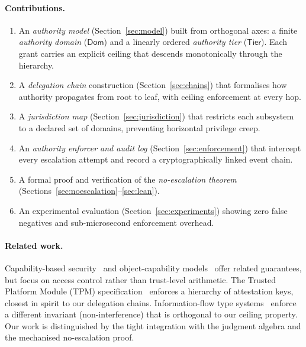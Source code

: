 \documentclass[11pt]{article}
\newcommand{\ADom}{\mathsf{Dom}}            %
\newcommand{\ATier}{\mathsf{Tier}}          %
\begin{document}
\paragraph{Contributions.}
\begin{enumerate}[leftmargin=1.5em,itemsep=2pt]
  \item An \emph{authority model} (Section~\ref{sec:model}) built from
        orthogonal axes: a finite \emph{authority domain}
        ($\ADom$) and a linearly ordered \emph{authority tier}
        ($\ATier$).  Each grant carries an explicit ceiling that
        descends monotonically through the hierarchy.
  \item A \emph{delegation chain} construction
        (Section~\ref{sec:chains}) that formalises how authority
        propagates from root to leaf, with ceiling enforcement at
        every hop.
  \item A \emph{jurisdiction map} (Section~\ref{sec:jurisdiction})
        that restricts each subsystem to a declared set of domains,
        preventing horizontal privilege creep.
  \item An \emph{authority enforcer and audit log}
        (Section~\ref{sec:enforcement}) that intercept every
        escalation attempt and record a cryptographically linked
        event chain.
  \item A formal proof and \LEAN{} verification of the
        \emph{no-escalation theorem}
        (Sections~\ref{sec:noescalation}--\ref{sec:lean}).
  \item An experimental evaluation (Section~\ref{sec:experiments})
        showing zero false negatives and sub-microsecond enforcement
        overhead.
\end{enumerate}

\paragraph{Related work.}
Capability-based security~\cite{dennis1966} and
object-capability models~\cite{miller2006} offer related guarantees,
but focus on access control rather than trust-level arithmetic.
The Trusted Platform Module (TPM) specification~\cite{tpm2}
enforces a hierarchy of attestation keys, closest in spirit to our
delegation chains.
Information-flow type systems~\cite{myers1999} enforce a different
invariant (non-interference) that is orthogonal to our ceiling
property.
Our work is distinguished by the tight integration with the \JuGeo{}
judgment algebra and the mechanised no-escalation proof.
\end{document}
